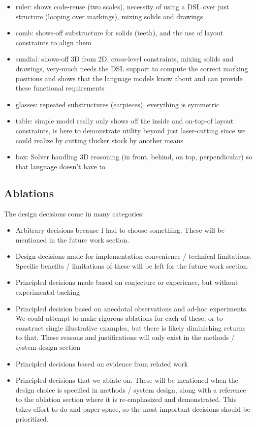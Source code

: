 \begin{itemize}
    \item ruler: shows code-reuse (two scales), necessity of using a DSL over just structure (looping over markings), mixing solids and drawings
    \item comb: shows-off substructure for solids (teeth), and the use of layout constraints to align them
    \item sundial: shows-off 3D from 2D, cross-level constraints, mixing solids and drawings, very-much needs the DSL support to compute the correct marking positions and shows that the language models know about and can provide these functional requirements
    \item glasses: repeated substructures (earpieces), everything is symmetric
    \item table: simple model really only shows off the inside and on-top-of layout constraints, is here to demonstrate utility beyond just laser-cutting since we could realize by cutting thicker stock by another means
    \item box: Solver handling 3D reasoning (in front, behind, on top, perpendicular) so that language doesn't have to
\end{itemize}

\subsection{Ablations}

The design decisions come in many categories:
\begin{itemize}
    \item Arbitrary decisions because I had to choose something. These will be mentioned in the future work section.
    \item Design decisions made for implementation convenience / technical limitations. Specific benefits / limitations of these will be left for the future work section.
    \item Principled decisions made based on conjecture or experience, but without experimental backing
    \item Principled decision based on anecdotal observations and ad-hoc experiments. We could attempt to make rigorous ablations for each of these, or to construct single illustrative examples, but there is likely diminishing returns to that. These reasons and justifications will only exist in the methods / system design section
    \item Principled decisions based on evidence from related work
    \item Principled decisions that we ablate on. These will be mentioned when the design choice is specified in methods / system design, along with a reference to the ablation section where it is re-emphasized and demonstrated. This takes effort to do and paper space, so the most important decisions should be prioritized.
\end{itemize}

